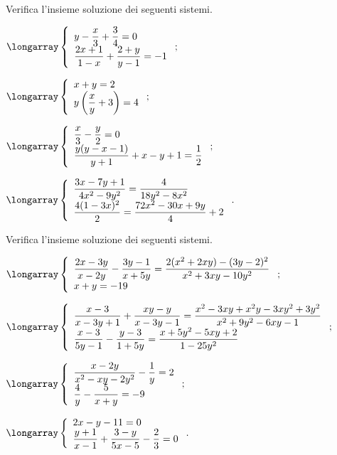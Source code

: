 \begin{esercizio}[\Ast]
 \label{ese:21.49}
Verifica l'insieme soluzione dei seguenti sistemi.
\begin{multicols}{2}
\begin{enumeratea}
\item $\longarray\left\{\begin{array}{l}y-\dfrac{x}{3}+\dfrac{3}{4}=0\\\dfrac{2x+1}{1-x}+\dfrac{2+y}{y-1}=-1\end{array}\right.;$
\item $\longarray\left\{\begin{array}{l}x+y=2\\y\left(\dfrac{x}{y}+3\right)=4\end{array}\right.;$
\item $\longarray\left\{\begin{array}{l}\dfrac{x}{3}-\dfrac{y}{2}=0\\\dfrac{y(y-x-1)}{y+1}+x-y+1=\dfrac{1}{2}\end{array}\right.;$
\item $\longarray\left\{\begin{array}{l}\dfrac{3x-7y+1}{4x^{2}-9y^{2}}=\dfrac{4}{18y^{2}-8x^{2}}\\\dfrac{4(1-3x)^{2}}{2}=\dfrac{72x^{2}-30x+9y}{4}+2\end{array}\right..$
\end{enumeratea}
\end{multicols}
\end{esercizio}

\begin{esercizio}[\Ast]
 \label{ese:21.50}
Verifica l'insieme soluzione dei seguenti sistemi.

\begin{enumeratea}
\item $\longarray\left\{\begin{array}{l}\dfrac{2x-3y}{x-2y}-\dfrac{3y-1}{x+5y}=\dfrac{2(x^{2}+2xy)-(3y-2)^{2}}{x^{2}+3xy-10y^{2}}\\x+y=-19\end{array}\right.;$
\item $\longarray\left\{\begin{array}{l}\dfrac{x-3}{x-3y+1}+\dfrac{xy-y}{x-3y-1}=\dfrac{x^{2}-3xy+x^{2}y-3xy^{2}+3y^{2}}{x^{2}+9y^{2}-6xy-1}\\\dfrac{x-3}{5y-1}-\dfrac{y-3}{1+5y}=\dfrac{x+5y^{2}-5xy+2}{1-25y^{2}}\end{array}\right.;$
\item $\longarray\left\{\begin{array}{l}\dfrac{x-2y}{x^{2}-xy-2y^{2}}-\dfrac{1}{y}=2\\\dfrac{4}{y}-\dfrac{5}{x+y}=-9\end{array}\right.;$
\item $\longarray\left\{\begin{array}{l}{2x-y-11=0}\\{\dfrac{y+1}{x-1}+\dfrac{3-y}{5x-5}-\dfrac{2}{3}=0}\end{array}\right..$
\end{enumeratea}
\end{esercizio}

